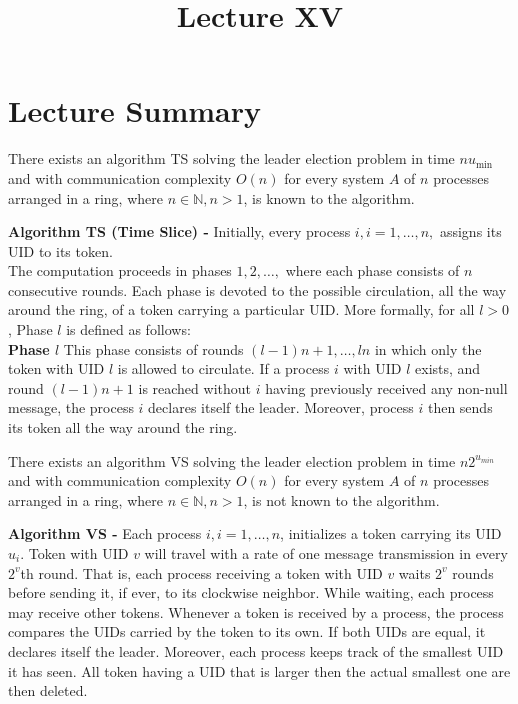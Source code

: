 \documentclass[a4paper]{article}
\title{\vspace{-2cm}Lecture XV\vspace{-2cm}}
\date{}
\begin{document}
\maketitle
\section{Lecture Summary}
\begin{theorem}
There exists an algorithm TS solving the leader election problem in time $n u_{\min}$ and with communication complexity $O(n)$ for every system $A$ of $n$ processes arranged in a ring, where $n \in \mathbb{N}, n > 1$, is known to the algorithm.
\end{theorem}


\begin{algorithm}
\textbf{Algorithm TS (Time Slice) -} Initially, every process $i, i = 1, \ldots, n,$ assigns its UID to its token. \\
The computation proceeds in phases $1, 2, \ldots,$ where each phase consists of $n$ consecutive rounds. Each phase is devoted to the possible circulation, all the way around the ring, of a token carrying a particular UID. More formally, for all $l > 0$, Phase $l$ is defined as follows: \\
\textbf{Phase $l$} This phase consists of rounds $(l - 1)n + 1, \ldots, ln$ in which only the token with UID $l$ is allowed to circulate. If a process $i$ with UID $l$ exists, and round $(l - 1)n + 1$ is reached without $i$ having previously received any non-null message, the process $i$ declares itself the leader. Moreover, process $i$ then sends its token all the way around the ring.
\end{algorithm}


\begin{theorem}
There exists an algorithm VS solving the leader election problem in time $n 2^{u_{min}}$ and with communication complexity $O(n)$ for every system $A$ of $n$ processes arranged in a ring, where $n \in \mathbb{N}, n > 1$, is not known to the algorithm.
\end{theorem}


\begin{algorithm}
\textbf{Algorithm VS -} Each process $i, i = 1, \ldots, n$, initializes a token carrying its UID $u_{i}$. Token with UID $v$ will travel with a rate of one message transmission in every $2^{v}$th round. That is, each process receiving a token with UID $v$ waits $2^{v}$ rounds before sending it, if ever, to its clockwise neighbor. While waiting, each process may receive other tokens. Whenever a token is received by a process, the process compares the UIDs carried by the token to its own. If both UIDs are equal, it declares itself the leader. Moreover, each process keeps track of the smallest UID it has seen. All token having a UID that is larger then the actual smallest one are then deleted.
\end{algorithm}
\end{document}
